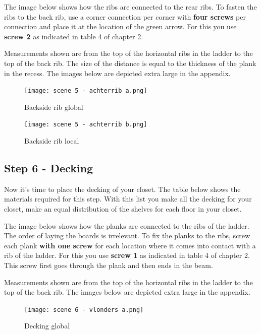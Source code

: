 \documentclass{article}
\begin{document}


The image below shows how the ribs are connected to the rear ribs. To fasten the ribs to the back rib, use a corner connection per corner with \textbf{four screws} per connection and place it at the location of the green arrow. For this you use \textbf{screw 2} as indicated in table 4 of chapter 2.

Measurements shown are from the top of the horizontal ribs in the ladder to the top of the back rib. The size of the distance is equal to the thickness of the plank in the recess. The images below are depicted extra large in the appendix.

\begin{figure}[h!]
    \centering
    \texttt{[image: scene 5 - achterrib a.png]}
    \caption{Backside rib global}
    \label{fig:stap 5a}
\end{figure}

\begin{figure}[h!]
    \centering
    \texttt{[image: scene 5 - achterrib b.png]}
    \caption{Backside rib local}
    \label{fig:stap 5b}
\end{figure}

\clearpage
\newpage

\subsection{Step 6 - Decking}

Now it's time to place the decking of your closet. The table below shows the materials required for this step. With this list you make all the decking for your closet, make an equal distribution of the shelves for each floor in your closet.



The image below shows how the planks are connected to the ribs of the ladder. The order of laying the boards is irrelevant. To fix the planks to the ribs, screw each plank \textbf{with one screw} for each location where it comes into contact with a rib of the ladder. For this you use \textbf{screw 1} as indicated in table 4 of chapter 2. This screw first goes through the plank and then ends in the beam.

Measurements shown are from the top of the horizontal ribs in the ladder to the top of the back rib. The images below are depicted extra large in the appendix.

\begin{figure}[h!]
    \centering
    \texttt{[image: scene 6 - vlonders a.png]}
    \caption{Decking global}
    \label{fig:stap 6a}
\end{figure}
\end{document}

